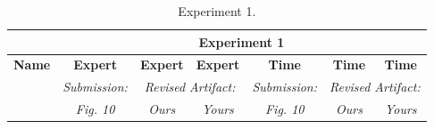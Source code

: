 \begin{table}

\experimentTableSize

\begin{tabular}{l|cccccc}
& \multicolumn{6}{c}{\textbf{Experiment 1}} \\\hline
\textbf{Name} &
\textbf{Expert} & \textbf{Expert} & \textbf{Expert} &
\textbf{Time} & \textbf{Time} & \textbf{Time} \\
&
\textit{Submission:} & \multicolumn{2}{c}{\textit{Revised Artifact:}} &
\textit{Submission:} & \multicolumn{2}{c}{\textit{Revised Artifact:}} \\
&
\textit{Fig. 10} & \textit{Ours} & \textit{Yours} &
\textit{Fig. 10} & \textit{Ours} & \textit{Yours} \\

\end{tabular}

\vspace{0.10in}

\caption{Experiment 1.}

\end{table}
